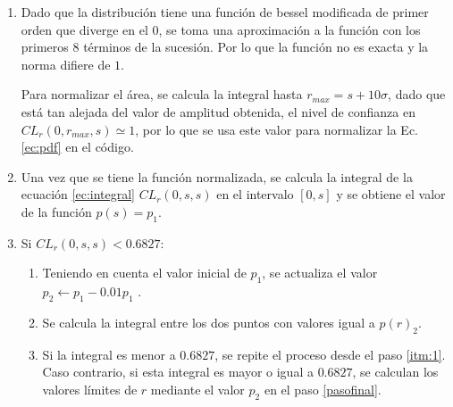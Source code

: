 \begin{enumerate}
    \item 
    Dado que la distribución tiene una función de bessel modificada de primer orden que diverge en el 0, se toma una aproximación a la función con los primeros 8 términos de la sucesión. Por lo que la función no es exacta y la norma difiere de $1$. 
    
    Para normalizar el área, se calcula la integral hasta $r_{max}=s +  10\sigma$, dado que está tan alejada del valor de amplitud obtenida, el nivel de confianza en $CL_r(0,r_{max},s)\simeq 1$, por lo que se  usa este valor para normalizar la Ec. \ref{ec:pdf} en el código.

    \item Una vez que se tiene la función normalizada, se calcula la integral de la ecuación \ref{ec:integral} $CL_r(0,s,s)$ en el intervalo  $[0,s]$ y se obtiene el valor de la función $p(s)=p_1$.

    \item Si $CL_r(0,s,s)< 0.6827$:
    \begin{enumerate}
        \item Teniendo en cuenta el valor inicial de $p_1$, se actualiza el valor  $p_2 \leftarrow p_1 - 0.01 p_1$ \label{itm:1}.
        \item Se calcula la integral entre los dos puntos con valores igual a $p(r)_2$. 
        \item \label{itm:3} Si la integral es menor a $0.6827$, se repite el proceso desde el paso \ref{itm:1}. Caso contrario, si esta integral es mayor o igual a $0.6827$, se calculan los valores límites de $r$ mediante el valor $p_2$ en el paso \ref{pasofinal}. 


\end{enumerate}
\end{enumerate}
